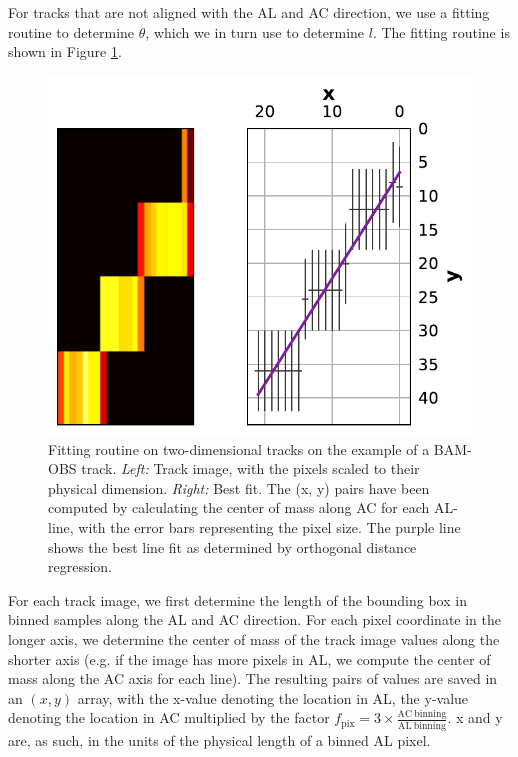 \documentclass[a4paper, 11pt]{article}
\begin{document}
For tracks that are not aligned with the AL and AC direction, we use a fitting routine to determine $\theta$, which we in turn use to determine $l$. The fitting routine is shown in Figure \ref{fig:2D_fit}.

\begin{figure}
  \centering
  \includegraphics{images/postprocessing/2D_fit}
  \caption{Fitting routine on two-dimensional tracks on the example of a BAM-OBS track. \textit{Left:} Track image, with the pixels scaled to their physical dimension. \textit{Right:} Best fit. The (x, y) pairs have been computed by calculating the center of mass along AC for each AL-line, with the error bars representing the pixel size. The purple line shows the best line fit as determined by orthogonal distance regression.}
  \label{fig:2D_fit}
\end{figure}

For each track image, we first determine the length of the bounding box in binned samples along the AL and AC direction. For each pixel coordinate in the longer axis, we determine the center of mass of the track image values along the shorter axis (e.g. if the image has more pixels in AL, we compute the center of mass along the AC axis for each line). The resulting pairs of values are saved in an $(x,y)$ array, with the x-value denoting the location in AL, the y-value denoting the location in AC multiplied by the factor $f_\mathrm{pix} = 3\times \frac{\mathrm{AC~binning}}{\mathrm{AL~binning}}$. x and y are, as such, in the units of the physical length of a binned AL pixel.
\end{document}
